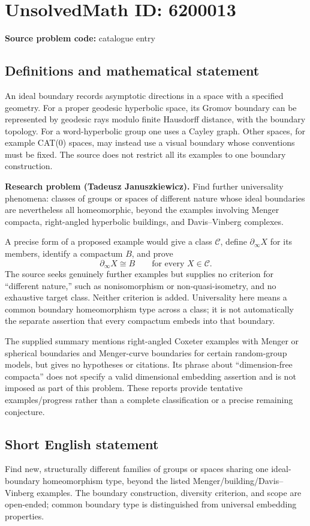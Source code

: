 \documentclass[11pt]{article}
\begin{document}
\section*{UnsolvedMath ID: 6200013}
\textbf{Source problem code:} catalogue entry
\subsection{Definitions and mathematical statement}
An ideal boundary records asymptotic directions in a space with a specified geometry. For a proper geodesic hyperbolic space, its Gromov boundary can be represented by geodesic rays modulo finite Hausdorff distance, with the boundary topology. For a word-hyperbolic group one uses a Cayley graph. Other spaces, for example CAT(0) spaces, may instead use a visual boundary whose conventions must be fixed. The source does not restrict all its examples to one boundary construction.

\textbf{Research problem (Tadeusz Januszkiewicz).} Find further universality phenomena: classes of groups or spaces of different nature whose ideal boundaries are nevertheless all homeomorphic, beyond the examples involving Menger compacta, right-angled hyperbolic buildings, and Davis--Vinberg complexes.

A precise form of a proposed example would give a class $\mathcal C$, define $\partial_\infty X$ for its members, identify a compactum $B$, and prove
\[
 \partial_\infty X\cong B\qquad\text{for every }X\in\mathcal C.
\]
The source seeks genuinely further examples but supplies no criterion for ``different nature,'' such as nonisomorphism or non-quasi-isometry, and no exhaustive target class. Neither criterion is added. Universality here means a common boundary homeomorphism type across a class; it is not automatically the separate assertion that every compactum embeds into that boundary.

The supplied summary mentions right-angled Coxeter examples with Menger or spherical boundaries and Menger-curve boundaries for certain random-group models, but gives no hypotheses or citations. Its phrase about ``dimension-free compacta'' does not specify a valid dimensional embedding assertion and is not imposed as part of this problem. These reports provide tentative examples/progress rather than a complete classification or a precise remaining conjecture.
\subsection{Short English statement}
Find new, structurally different families of groups or spaces sharing one ideal-boundary homeomorphism type, beyond the listed Menger/building/Davis--Vinberg examples. The boundary construction, diversity criterion, and scope are open-ended; common boundary type is distinguished from universal embedding properties.
\end{document}
